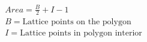\begin{align*}
& Area = \frac{B}{2}+I-1 \\
& B = \text{Lattice points on the polygon} \\
& I = \text{Lattice points in polygon interior}
\end{align*}